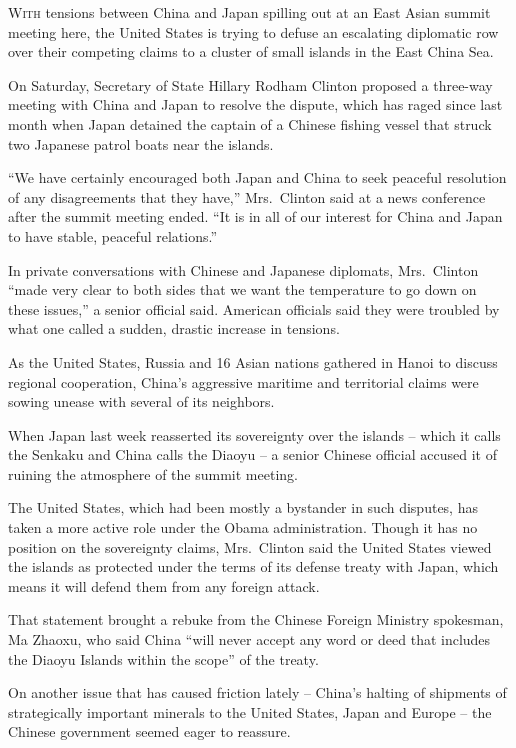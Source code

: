 ﻿\documentclass[12pt]{article}
\begin{document}
\lettrine{W}{ith} tensions between China and Japan spilling out at an East
Asian summit meeting here, the United States is trying to defuse an escalating diplomatic row over
their competing claims to a cluster of small islands in the East China Sea.

On Saturday, Secretary of State Hillary Rodham Clinton proposed a three-way meeting with China and
Japan to resolve the dispute, which has raged since last month when Japan detained the captain of a
Chinese fishing vessel that struck two Japanese patrol boats near the islands.

``We have certainly encouraged both Japan and China to seek peaceful resolution of any disagreements
that they have,'' Mrs.~Clinton said at a news conference after the summit meeting ended. ``It is in
all of our interest for China and Japan to have stable, peaceful relations.''

In private conversations with Chinese and Japanese diplomats, Mrs.~Clinton ``made very clear to both
sides that we want the temperature to go down on these issues,'' a senior official said. American
officials said they were troubled by what one called a sudden, drastic increase in tensions.

As the United States, Russia and 16 Asian nations gathered in Hanoi to discuss regional cooperation,
China's aggressive maritime and territorial claims were sowing unease with several of its neighbors.

When Japan last week reasserted its sovereignty over the islands -- which it calls the Senkaku and
China calls the Diaoyu -- a senior Chinese official accused it of ruining the atmosphere of the
summit meeting.

The United States, which had been mostly a bystander in such disputes, has taken a more active role
under the Obama administration. Though it has no position on the sovereignty claims, Mrs.~Clinton
said the United States viewed the islands as protected under the terms of its defense treaty with
Japan, which means it will defend them from any foreign attack.

That statement brought a rebuke from the Chinese Foreign Ministry spokesman, Ma Zhaoxu, who said
China ``will never accept any word or deed that includes the Diaoyu Islands within the scope'' of
the treaty.

On another issue that has caused friction lately -- China's halting of shipments of strategically
important minerals to the United States, Japan and Europe -- the Chinese government seemed eager to
reassure.
\end{document}
